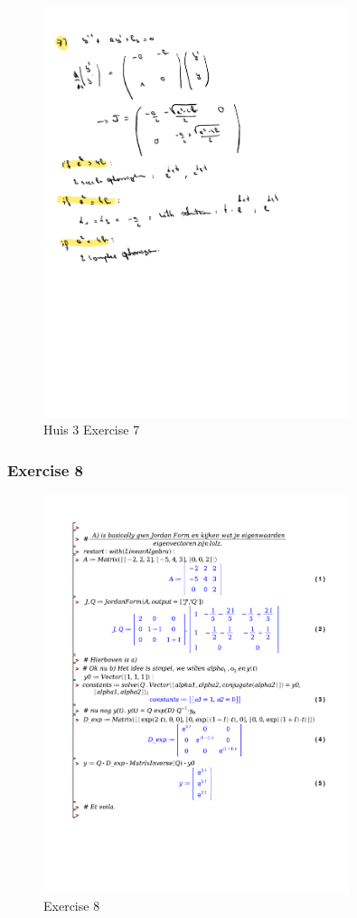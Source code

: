 \documentclass[a4paper]{report}
\begin{document}
\begin{figure}[H]
	\centering
	\includegraphics[width=0.8\textwidth]{assets/huis_3_ex_7.pdf}
	\caption{Huis 3 Exercise 7}
\end{figure}

\subsubsection{Exercise 8}

\begin{figure}[H]
	\centering
	\includegraphics[width=0.8\textwidth]{exercises/huis_3_ex_8.pdf}
	\caption{Exercise 8}
	\label{fig:huis_3_ex_8}
\end{figure}
\end{document}
